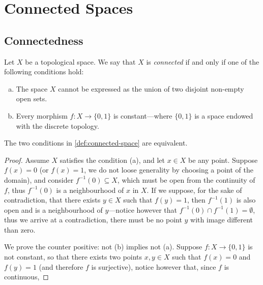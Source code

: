 \section{Connected Spaces}

\subsection{Connectedness}

\begin{definition}
    \label{def:connected-space}
    Let \(X\) be a topological space. We say that \(X\) is \emph{connected} if and
    only if one of the following conditions hold:
    \begin{enumerate}[(a)]\setlength\itemsep{0em}
        \item The space \(X\) cannot be expressed as the union of two disjoint non-empty
              open sets.
        \item Every morphism \(f: X \to \{0, 1\}\) is constant---where \(\{0, 1\}\) is
              a space endowed with the discrete topology.
    \end{enumerate}
\end{definition}

\begin{corollary}
    The two conditions in \cref{def:connected-space} are equivalent.
\end{corollary}

\begin{proof}
    Assume \(X\) satisfies the condition (a), and let \(x \in X\) be any
    point. Suppose \(f(x) = 0\) (or \(f(x) = 1\), we do not loose generality by
    choosing a point of the domain), and consider \(f^{-1}(0) \subseteq X\), which
    must be open from the continuity of \(f\), thus \(f^{-1}(0)\) is a neighbourhood
    of \(x\) in \(X\). If we suppose, for the sake of contradiction, that there
    exists \(y \in X\) such that \(f(y) = 1\), then \(f^{-1}(1)\) is also open and
    is a neighbourhood of \(y\)---notice however that \(f^{-1}(0) \cap f^{-1}(1) =
    \emptyset\), thus we arrive at a contradiction, there must be no point \(y\)
    with image different than zero.

    We prove the counter positive: not (b) implies not (a). Suppose \(f: X
    \to \{0, 1\}\) is not constant, so that there exists two points \(x, y \in X\)
    such that \(f(x) = 0\) and \(f(y) = 1\) (and therefore \(f\) is surjective),
    notice however that, since \(f\) is continuous,
\end{proof}

